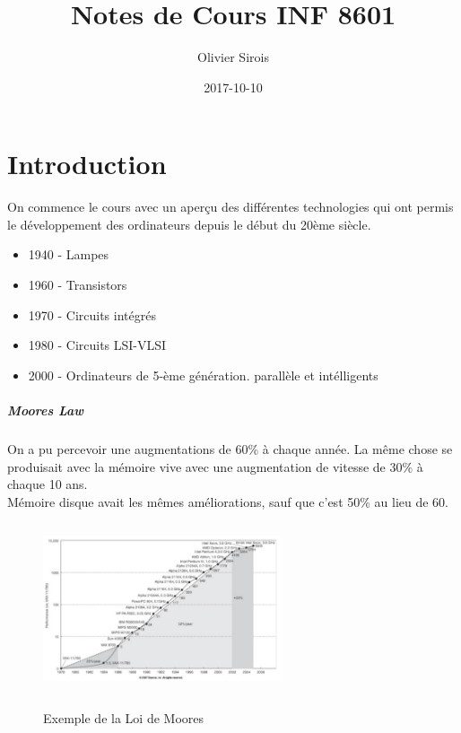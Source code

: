 \documentclass[oneside]{book}
\title{Notes de Cours INF 8601}
\date{2017-10-10}
\author{Olivier Sirois}
\begin{document}
\setcounter{page}{1}
\maketitle
\tableofcontents
\chapter{Introduction}
On commence le cours avec un aperçu des différentes technologies qui ont permis le développement des ordinateurs depuis le début du 20ème siècle. \\

\begin{itemize}
\item 1940 - Lampes
\item 1960 - Transistors
\item 1970 - Circuits intégrés
\item 1980 - Circuits LSI-VLSI
\item 2000 - Ordinateurs de 5-ème génération. parallèle et intélligents
\end{itemize}
\paragraph{Moores Law}
On a pu percevoir une augmentations de 60\% à chaque année. La même chose se produisait avec la mémoire vive avec une augmentation de vitesse de 30\% à chaque 10 ans. \\

Mémoire disque avait les mêmes améliorations, sauf que c'est 50\% au lieu de 60.

\begin{figure}[!ht]
\centering
\includegraphics[height = 5cm, width = 7cm, keepaspectratio]{Moores.png}
\label{fig:moores}
\caption{Exemple de la Loi de Moores}
\end{figure}
\end{document}

